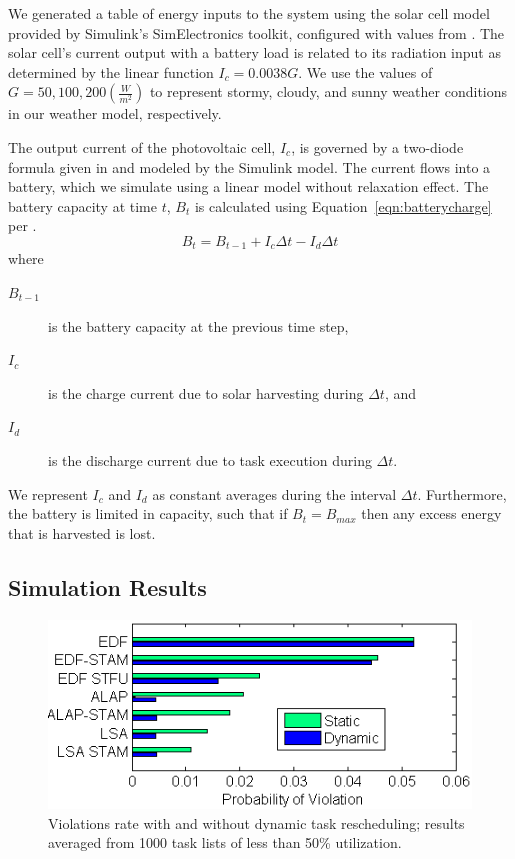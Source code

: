 We generated a table of energy inputs to the system using the solar cell model provided by 
Simulink's SimElectronics toolkit, configured with values from \cite{gonzalez2006model}.  
The solar cell's current output with a battery load is related to its radiation input as 
determined by the linear function $I_c = 0.0038G$.  
We use the values of $G = 50, 100, 200 (\frac{W}{m^2})$ to represent stormy, cloudy, and sunny weather conditions 
in our weather model, respectively. 

The output current of the photovoltaic cell, $I_c$, is governed by a two-diode formula given in \cite{marwali1997probabilistic} and modeled by the Simulink model.  
The current flows into a battery, which we simulate using a linear model without relaxation effect.  
The battery capacity at time $t$, $B_t$ is calculated using Equation~\ref{eqn:batterycharge} per \cite{niyato2007sleep}.
\begin{equation}
 B_t = B_{t-1} + I_c \Delta t - I_d \Delta t
\label{eqn:batterycharge}
\end{equation}
where 
\begin{description}
\item[$B_{t-1}$] is the battery capacity at the previous time step,
\item[$I_c$] is the charge current due to solar harvesting during $\Delta t$, and 
\item[$I_d$] is the discharge current due to task execution during $\Delta t$.
\end{description}
We represent $I_c$ and $I_d$  as constant averages during the interval $\Delta t$. Furthermore, the battery is
limited in capacity, such that if $B_t = B_{max}$ then any excess energy that is harvested is lost.

\subsection{Simulation Results}

\begin{figure}[tb]
\begin{center}
\includegraphics[scale=0.65]{bar.png}
\end{center}
\caption{Violations rate with and without dynamic task rescheduling; 
results averaged from 1000 task lists of less than 50\% utilization.  \label{fig:simresults}}
\end{figure}

